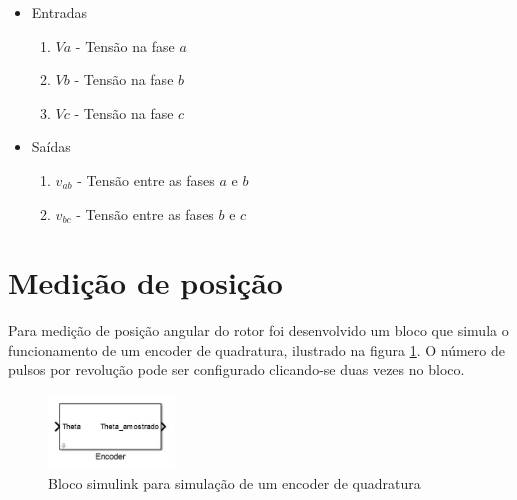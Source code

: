         \begin{itemize}
            \item Entradas
                \begin{enumerate}
                    \item $Va$ - Tensão na fase $a$
                    \item $Vb$ - Tensão na fase $b$
                    \item $Vc$ - Tensão na fase $c$
                \end{enumerate}
            \item Saídas
                \begin{enumerate}
                    \item $v_{ab}$ - Tensão entre as fases $a$ e $b$
                    \item $v_{bc}$ - Tensão entre as fases $b$ e $c$
                \end{enumerate}
        \end{itemize}

    \newpage
    \section{Medição de posição}
        Para medição de posição angular do rotor foi desenvolvido um bloco que simula o funcionamento de um encoder de quadratura, ilustrado na figura \ref{fig:bloco_encoder}. O número de pulsos por revolução pode ser configurado clicando-se duas vezes no bloco.
        \begin{figure}[ht]
            \centering
            \includegraphics[width=0.3\textwidth]{bloco_encoder}
            \caption{Bloco simulink para simulação de um encoder de quadratura}
            \label{fig:bloco_encoder}
        \end{figure}

